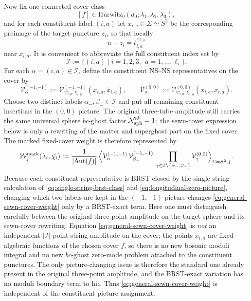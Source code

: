 \documentclass[11pt]{article}
\newcommand{\mc}[1]{\mathcal{#1}}
\begin{document}
Now fix one connected cover class
\[
[f]\in \mathrm{Hurwitz}_0(d_0;\lambda_1,\lambda_2,\lambda_3),
\]
and for each constituent label $(i,a)$ let $x_{i,a}\in \Sigma\simeq S^2$ be the corresponding preimage of the target puncture $z_i$, so that locally
\[
u-z_i=t_{i,a}^{\,w_{i,a}}
\]
near $x_{i,a}$. It is convenient to abbreviate the full constituent index set by
\begin{equation}\label{eq:constituent-index-set}
\mathcal I:=\{(i,a)\mid i=1,2,3,\ \ a=1,\dots,\ell_i\}.
\end{equation}
For each $\alpha=(i,a)\in \mathcal I$, define the constituent NS--NS representatives on the cover by
\begin{equation}\label{eq:general-cover-constituent-vertices}
\mc V_{\alpha}^{(-1,-1)}
:=
\mc V_{w_{i,a},\chi_{i,a}}^{(-1,-1)}(x_{i,a},\bar x_{i,a}),
\qquad
\mc V_{\alpha}^{(0,0)}
:=
\mc V_{w_{i,a},\chi_{i,a}}^{(0,0)}(x_{i,a},\bar x_{i,a}).
\end{equation}
Choose two distinct labels $\alpha_-,\beta_-\in \mathcal I$ and put all remaining constituent insertions in the $(0,0)$ picture. The original three-tube amplitude still carries the same universal sphere $bc$-ghost factor $\mc N_{\rm sph}^{\rm gh}=1$; the sewn-cover expression below is only a rewriting of the matter and superghost part on the fixed cover. The marked fixed-cover weight is therefore represented by
\begin{equation}\label{eq:general-sewn-cover-weight}
\mc W_f^{\rm mark}(\lambda_i,\vec\chi_i)
:=
\frac{1}{|\mathrm{Aut}(f)|}\,
\Big\langle
\mc V_{\alpha_-}^{(-1,-1)}\,
\mc V_{\beta_-}^{(-1,-1)}\,
\prod_{\gamma\in\mathcal I\setminus\{\alpha_-,\beta_-\}}
\mc V_{\gamma}^{(0,0)}
\Big\rangle_{\Sigma=S^2,f}.
\end{equation}
Because each constituent representative is BRST closed by the single-string calculation of \eqref{eq:single-string-brst-class} and \eqref{eq:longitudinal-zero-picture}, changing which two labels are kept in the $(-1,-1)$ picture changes \eqref{eq:general-sewn-cover-weight} only by a BRST-exact term. Here one must distinguish carefully between the original three-point amplitude on the target sphere and its sewn-cover rewriting. Equation \eqref{eq:general-sewn-cover-weight} is \emph{not} an independent $|\mathcal I|$-point string amplitude on the cover; the points $x_{i,a}$ are fixed algebraic functions of the chosen cover $f$, so there is no new bosonic moduli integral and no new $bc$-ghost zero-mode problem attached to the constituent punctures. The only picture-changing issue is therefore the standard one already present in the original three-point amplitude, and the BRST-exact variation has no moduli boundary term to hit. Thus \eqref{eq:general-sewn-cover-weight} is independent of the constituent picture assignment.
\end{document}
